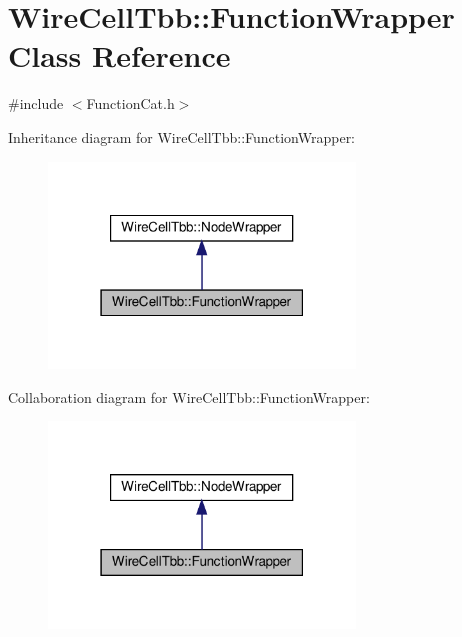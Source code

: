 \hypertarget{class_wire_cell_tbb_1_1_function_wrapper}{}\section{Wire\+Cell\+Tbb\+:\+:Function\+Wrapper Class Reference}
\label{class_wire_cell_tbb_1_1_function_wrapper}


{\ttfamily \#include $<$Function\+Cat.\+h$>$}



Inheritance diagram for Wire\+Cell\+Tbb\+:\+:Function\+Wrapper\+:
\nopagebreak
\begin{figure}[H]
\begin{center}
\leavevmode
\includegraphics[width=231pt]{class_wire_cell_tbb_1_1_function_wrapper__inherit__graph}
\end{center}
\end{figure}


Collaboration diagram for Wire\+Cell\+Tbb\+:\+:Function\+Wrapper\+:
\nopagebreak
\begin{figure}[H]
\begin{center}
\leavevmode
\includegraphics[width=231pt]{class_wire_cell_tbb_1_1_function_wrapper__coll__graph}
\end{center}
\end{figure}
